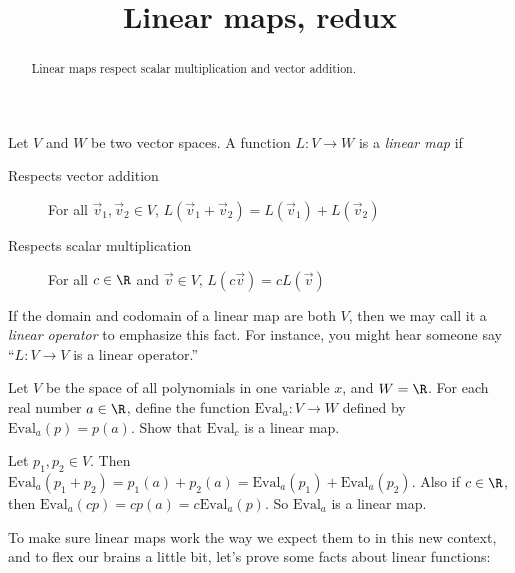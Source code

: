 \documentclass{ximera}
\title{Linear maps, redux}
\begin{document}
\begin{abstract}
  Linear maps respect scalar multiplication and vector addition.
\end{abstract}

\begin{definition}
  Let $V$ and $W$ be two vector spaces.  A function $L: V \to W$ is a \textit{linear map} if 
  \begin{description}
  \item[Respects vector addition] For all $\vec{v}_1,\vec{v}_2 \in V$, $L(\vec{v}_1+\vec{v}_2) = L(\vec{v}_1)+L(\vec{v}_2)$
  \item[Respects scalar multiplication] For all $c \in \R$ and $\vec{v} \in V$, $L(c\vec{v}) = cL(\vec{v})$
  \end{description}
\end{definition}

If the domain and codomain of a linear map are both $V$, then we may
call it a \textit{linear operator} to emphasize this fact.  For
instance, you might hear someone say ``$L : V \to V$ is a linear
operator.''

Let $V$ be the space of all polynomials in one variable $x$, and $W =
\R$.  For each real number $a \in \R$, define the function $\text{Eval}_a: V
\to W$ defined by $\text{Eval}_a(p) = p(a)$.  Show that $\text{Eval}_c$ is a linear
map.

\begin{free-response}	
  Let $p_1, p_2 \in V$.  Then $\text{Eval}_a(p_1+p_2)  = p_1(a)+p_2(a) = \text{Eval}_a(p_1) + \text{Eval}_a(p_2)$.  Also if $c \in \R$, then $\text{Eval}_a(cp) = cp(a) = c\text{Eval}_a(p)$.  So $\text{Eval}_a$
  is a linear map.
\end{free-response}




To make sure linear maps work the way we expect them to in this new context, and to flex our brains a little bit, let's prove some facts about linear functions:
\end{document}
